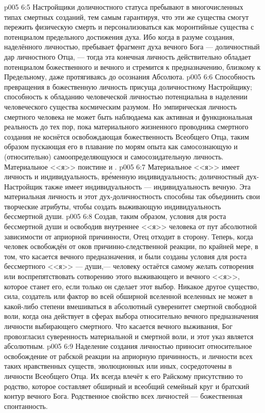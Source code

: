\vs p005 6:5 \pc Настройщики доличностного статуса пребывают в многочисленных типах смертных созданий, тем самым гарантируя, что эти же существа смогут пережить физическую смерть и персонализоваться как моронтийные существа с потенциалом предельного достижения духа. Ибо когда в разуме создания, наделённого личностью, пребывает фрагмент духа вечного Бога --- доличностный дар личностного Отца, --- тогда эта конечная личность действительно обладает потенциалом божественного и вечного и стремится к предназначению, близкому к Предельному, даже протягиваясь до осознания Абсолюта.
\vs p005 6:6 Способность превращения в божественную личность присуща доличностному Настройщику; способность к обладанию человеческой личностью потенциальна в наделении человеческого существа космическим разумом. Но эмпирическая личность смертного человека не может быть наблюдаема как активная и функциональная реальность до тех пор, пока материального жизненного проводника смертного создания не коснётся освобождающая божественность Всеобщего Отца, таким образом пускающая его в плавание по морям опыта как самосознающую и (относительно) самоопределяющуюся и самосозидательную личность. Материальное <<я>> поистине и .
\vs p005 6:7 \pc Материальное <<я>> имеет личность и индивидуальность, вр\'еменную индивидуальность; доличностный дух\hyp{}Настройщик также имеет индивидуальность --- индивидуальность вечную. Эта материальная личность и этот дух\hyp{}доличностность способны так объединить свои творческие атрибуты, чтобы создать выживающую индивидуальность бессмертной души.
\vs p005 6:8 Создав, таким образом, условия для роста бессмертной души и освободив внутреннее <<я>> человека от пут абсолютной зависимости от априорной причинности, Отец отходит в сторону. Теперь, когда человек освобождён от оков причинно\hyp{}следственной реакции, по крайней мере, в том, что касается вечного предназначения, и были созданы условия для роста бессмертного <<я>> --- души,--- человеку остаётся самому желать сотворения или воспрепятствовать сотворению этого выживающего и вечного <<я>>, которое станет его, если только он сделает этот выбор. Никакое другое существо, сила, создатель или фактор во всей обширной вселенной вселенных не может в какой\hyp{}либо степени вмешиваться в абсолютный суверенитет смертной свободной воли, когда она действует в сферах выбора относительно вечного предназначения личности выбирающего смертного. Что касается вечного выживания, Бог провозгласил суверенность материальной и смертной воли, и этот указ является абсолютным.
\vs p005 6:9 \pc Наделение создания личностью приносит относительное освобождение от рабской реакции на априорную причинность, и личности всех таких нравственных существ, эволюционных или иных, сосредоточены в личности Всеобщего Отца. Их всегда влечёт к его Райскому присутствию то родство, которое составляет обширный и всеобщий семейный круг и братский контур вечного Бога. Родственное свойство всех личностей --- божественная спонтанность.
